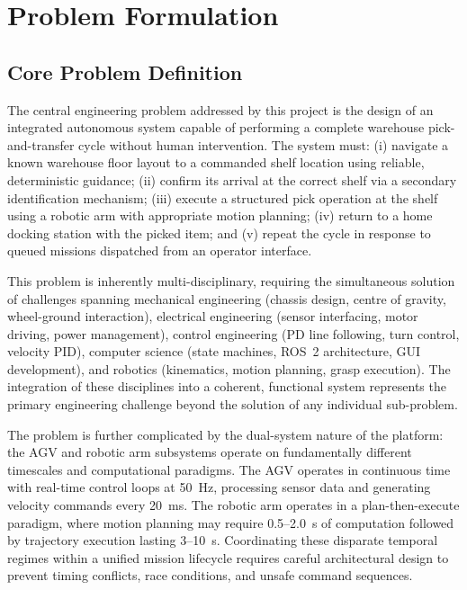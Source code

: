 \documentclass[12pt,a4paper,oneside]{report}
\begin{document}
\chapter{Problem Formulation}

\section{Core Problem Definition}

The central engineering problem addressed by this project is the design of an integrated autonomous system capable of performing a complete warehouse pick-and-transfer cycle without human intervention. The system must: (i) navigate a known warehouse floor layout to a commanded shelf location using reliable, deterministic guidance; (ii) confirm its arrival at the correct shelf via a secondary identification mechanism; (iii) execute a structured pick operation at the shelf using a robotic arm with appropriate motion planning; (iv) return to a home docking station with the picked item; and (v) repeat the cycle in response to queued missions dispatched from an operator interface.

This problem is inherently multi-disciplinary, requiring the simultaneous solution of challenges spanning mechanical engineering (chassis design, centre of gravity, wheel-ground interaction), electrical engineering (sensor interfacing, motor driving, power management), control engineering (PD line following, turn control, velocity PID), computer science (state machines, ROS~2 architecture, GUI development), and robotics (kinematics, motion planning, grasp execution). The integration of these disciplines into a coherent, functional system represents the primary engineering challenge beyond the solution of any individual sub-problem.

The problem is further complicated by the dual-system nature of the platform: the AGV and robotic arm subsystems operate on fundamentally different timescales and computational paradigms. The AGV operates in continuous time with real-time control loops at 50~Hz, processing sensor data and generating velocity commands every 20~ms. The robotic arm operates in a plan-then-execute paradigm, where motion planning may require 0.5--2.0~s of computation followed by trajectory execution lasting 3--10~s. Coordinating these disparate temporal regimes within a unified mission lifecycle requires careful architectural design to prevent timing conflicts, race conditions, and unsafe command sequences.
\end{document}
